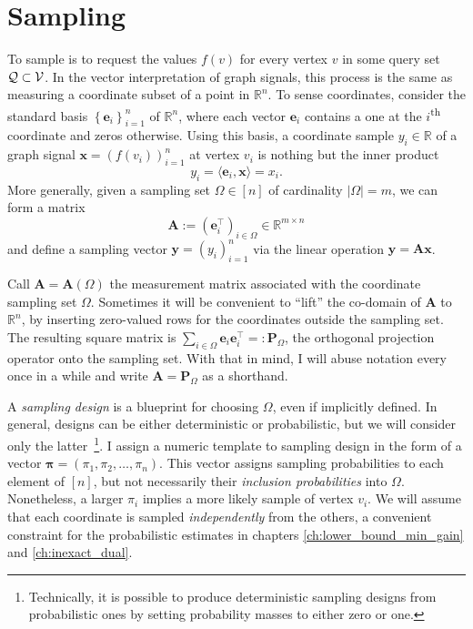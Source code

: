 \section{Sampling}\label{sec:sampling}

To sample is to request the values $f(v)$ for every vertex $v$ in some query set $\mathcal{Q} \subset \mathcal{V}$. In the vector interpretation of graph signals, this process is the same as measuring a coordinate subset of a point in $\mathbb{R}^{n}$. To sense coordinates, consider the standard basis $\left\{\mathbf{e}_i\right\}_{i=1}^n$ of $\mathbb{R}^{n}$, where each vector $\mathbf{e}_i$ contains a one at the $i$\textsuperscript{th} coordinate and zeros otherwise. Using this basis, a coordinate sample $y_i \in \mathbb{R}$ of a graph signal $\mathbf{x} = (f(v_i))_{i=1}^n$ at vertex $v_i$ is nothing but the inner product
\begin{equation*}
    y_i = \langle \mathbf{e}_i, \mathbf{x} \rangle = x_i.
\end{equation*}
More generally, given a sampling set $\Omega \in [n]$ of cardinality $|\Omega| = m$, we can form a matrix
\begin{equation}
    \mathbf{A} := \left( \mathbf{e}_i^\top \right)_{i \in \Omega} \in \mathbb{R}^{m \times n}
\end{equation}
and define a sampling vector $\mathbf{y} = (y_i)_{i=1}^n$ via the linear operation $\mathbf{y} = \mathbf{Ax}$.

Call $\mathbf{A} = \mathbf{A}(\Omega)$ the measurement matrix associated with the coordinate sampling set $\Omega$. Sometimes it will be convenient to ``lift'' the co-domain of $\mathbf{A}$ to $\mathbb{R}^{n}$, by inserting zero-valued rows for the coordinates outside the sampling set. The resulting square matrix is $\sum_{i \in \Omega} \mathbf{e}_i \mathbf{e}_i^\top =: \mathbf{P}_{\Omega}$, the orthogonal projection operator onto the sampling set. With that in mind, I will abuse notation every once in a while and write $\mathbf{A} = \mathbf{P}_{\Omega}$ as a shorthand.

A \emph{sampling design} is a blueprint for choosing $\Omega$, even if implicitly defined. In general, designs can be either deterministic or probabilistic, but we will consider only the latter~\footnote{Technically, it is possible to produce deterministic sampling designs from probabilistic ones by setting probability masses to either zero or one.}. I assign a numeric template to sampling design in the form of a vector $\bm{\pi} = (\pi_1, \pi_2, \dots, \pi_n)$. This vector assigns sampling probabilities to each element of $[n]$, but not necessarily their \emph{inclusion probabilities} into $\Omega$. Nonetheless, a larger $\pi_i$ implies a more likely sample of vertex $v_i$. We will assume that each coordinate is sampled \emph{independently} from the others, a convenient constraint for the probabilistic estimates in chapters \ref{ch:lower_bound_min_gain} and \ref{ch:inexact_dual}.

